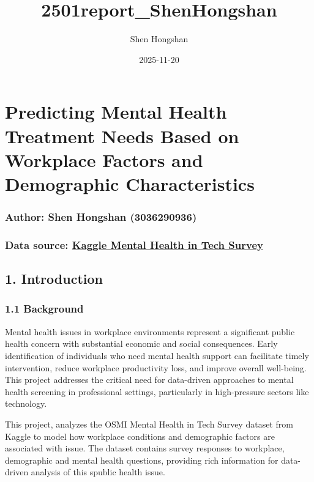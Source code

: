 \documentclass[
]{article}
\title{2501report\_ShenHongshan}
\author{Shen Hongshan}
\date{2025-11-20}
\begin{document}
\maketitle

\section{Predicting Mental Health Treatment Needs Based on Workplace
Factors and Demographic
Characteristics}\label{predicting-mental-health-treatment-needs-based-on-workplace-factors-and-demographic-characteristics}

\subsubsection{Author: Shen Hongshan
(3036290936)}\label{author-shen-hongshan-3036290936}

\subsubsection{\texorpdfstring{Data source:
\href{https://www.kaggle.com/datasets/osmi/mental-health-in-tech-survey/data}{Kaggle
Mental Health in Tech
Survey}}{Data source: Kaggle Mental Health in Tech Survey}}\label{data-source-kaggle-mental-health-in-tech-survey}

\subsection{\texorpdfstring{\textbf{1.
Introduction}}{1. Introduction}}\label{introduction}

\subsubsection{1.1 Background}\label{background}

Mental health issues in workplace environments represent a significant
public health concern with substantial economic and social consequences.
Early identification of individuals who need mental health support can
facilitate timely intervention, reduce workplace productivity loss, and
improve overall well-being. This project addresses the critical need for
data-driven approaches to mental health screening in professional
settings, particularly in high-pressure sectors like technology.

This project, analyzes the OSMI Mental Health in Tech Survey dataset
from Kaggle to model how workplace conditions and demographic factors
are associated with issue. The dataset contains survey responses to
workplace, demographic and mental health questions, providing rich
information for data-driven analysis of this spublic health issue.
\end{document}
